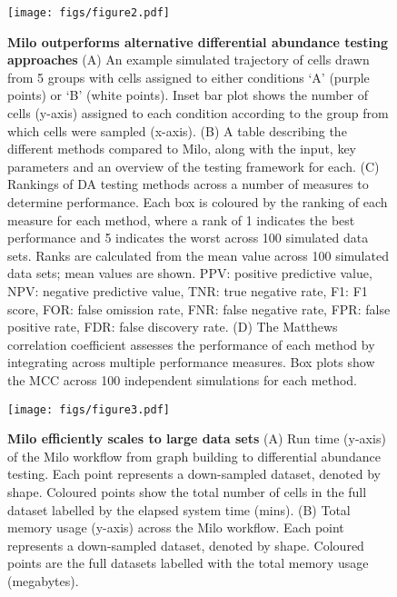 \documentclass[
  10pt,
]{article}
\begin{document}
\begin{figure}
\centering
\texttt{[image: figs/figure2.pdf]}
\caption{\label{fig:fig-2}\textbf{Milo outperforms alternative differential abundance testing approaches}
(A) An example simulated trajectory of cells drawn from 5 groups with cells assigned to either conditions `A' (purple points) or `B' (white points). Inset bar plot shows the number of cells (y-axis) assigned to each condition according to the group from which cells were sampled (x-axis).
(B) A table describing the different methods compared to Milo, along with the input, key parameters and an overview of the testing framework for each.
(C) Rankings of DA testing methods across a number of measures to determine performance. Each box is coloured by the ranking of each measure for each method, where a rank of 1 indicates the best performance and 5 indicates the worst across 100 simulated data sets. Ranks are calculated from the mean value across 100 simulated data sets; mean values are shown. PPV: positive predictive value, NPV: negative predictive value, TNR: true negative rate, F1: F1 score, FOR: false omission rate, FNR: false negative rate, FPR: false positive rate, FDR: false discovery rate.
(D) The Matthews correlation coefficient assesses the performance of each method by integrating across multiple performance measures. Box plots show the MCC across 100 independent simulations for each method.}
\end{figure}







\begin{figure}
\centering
\texttt{[image: figs/figure3.pdf]}
\caption{\label{fig:fig-3}\textbf{Milo efficiently scales to large data sets}
(A) Run time (y-axis) of the Milo workflow from graph building to differential abundance testing. Each point represents a down-sampled dataset, denoted by shape. Coloured points show the total number of cells in the full dataset labelled by the elapsed system time (mins).
(B) Total memory usage (y-axis) across the Milo workflow. Each point represents a down-sampled dataset, denoted by shape. Coloured points are the full datasets labelled with the total memory usage (megabytes).}
\end{figure}
\end{document}
